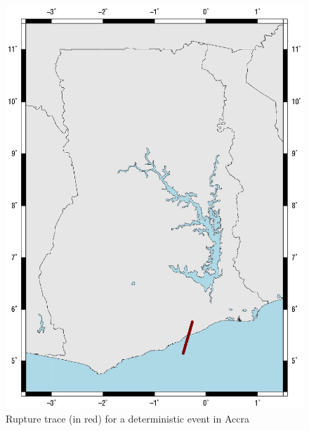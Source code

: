 \begin{figure}[htb]
	\centering
		\includegraphics{./figures/rupture.eps}
	\caption{Rupture trace (in red) for a deterministic event in Accra}
	\label{fig:rupture}
\end{figure}
